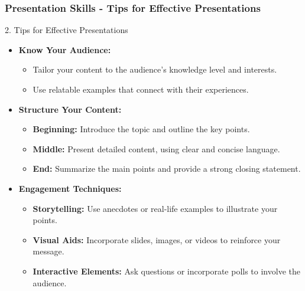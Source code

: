 \documentclass{beamer}
\begin{document}
\begin{frame}[fragile]
    \frametitle{Presentation Skills - Tips for Effective Presentations}
    \begin{block}{2. Tips for Effective Presentations}
        \begin{itemize}
            \item \textbf{Know Your Audience:}
              \begin{itemize}
                  \item Tailor your content to the audience's knowledge level and interests.
                  \item Use relatable examples that connect with their experiences.
              \end{itemize}
            \item \textbf{Structure Your Content:}
              \begin{itemize}
                  \item \textbf{Beginning:} Introduce the topic and outline the key points.
                  \item \textbf{Middle:} Present detailed content, using clear and concise language.
                  \item \textbf{End:} Summarize the main points and provide a strong closing statement.
              \end{itemize}
            \item \textbf{Engagement Techniques:}
              \begin{itemize}
                  \item \textbf{Storytelling:} Use anecdotes or real-life examples to illustrate your points.
                  \item \textbf{Visual Aids:} Incorporate slides, images, or videos to reinforce your message.
                  \item \textbf{Interactive Elements:} Ask questions or incorporate polls to involve the audience.
              \end{itemize}
        \end{itemize}
    \end{block}
\end{frame}
\end{document}
